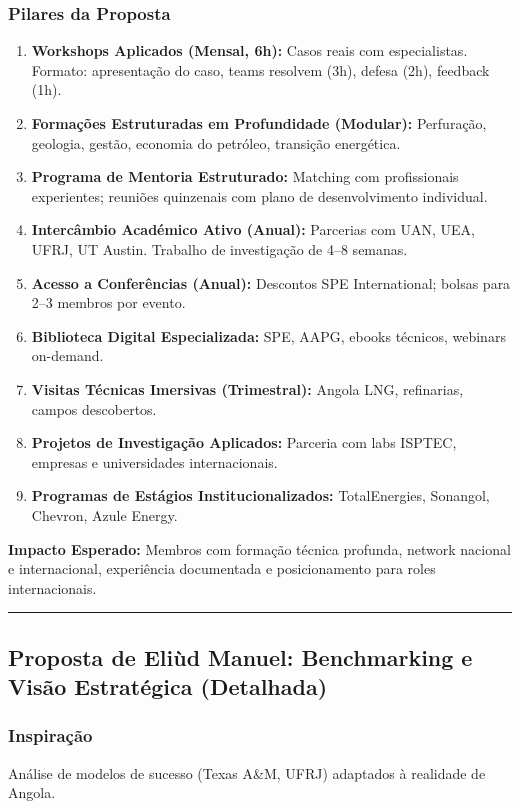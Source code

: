 \documentclass[12pt,a4paper]{article}
\newcommand{\proposalsep}{%
  \vspace{6pt}%
  {\color{gold}\rule{0.35\linewidth}{0.7pt}}%
  \vspace{4pt}%
}
\begin{document}
\subsubsection*{Pilares da Proposta}

\begin{enumerate}
    \item \textbf{Workshops Aplicados (Mensal, 6h):} Casos reais com especialistas. Formato: apresentação do caso, teams resolvem (3h), defesa (2h), feedback (1h).
    \item \textbf{Formações Estruturadas em Profundidade (Modular):} Perfuração, geologia, gestão, economia do petróleo, transição energética.
    \item \textbf{Programa de Mentoria Estruturado:} Matching com profissionais experientes; reuniões quinzenais com plano de desenvolvimento individual.
    \item \textbf{Intercâmbio Académico Ativo (Anual):} Parcerias com UAN, UEA, UFRJ, UT Austin. Trabalho de investigação de 4–8 semanas.
    \item \textbf{Acesso a Conferências (Anual):} Descontos SPE International; bolsas para 2–3 membros por evento.
    \item \textbf{Biblioteca Digital Especializada:} SPE, AAPG, ebooks técnicos, webinars on-demand.
    \item \textbf{Visitas Técnicas Imersivas (Trimestral):} Angola LNG, refinarias, campos descobertos.
    \item \textbf{Projetos de Investigação Aplicados:} Parceria com labs ISPTEC, empresas e universidades internacionais.
    \item \textbf{Programas de Estágios Institucionalizados:} TotalEnergies, Sonangol, Chevron, Azule Energy.
\end{enumerate}

\begin{infobox}
\small\textbf{Impacto Esperado:} Membros com formação técnica profunda, network nacional e internacional, experiência documentada e posicionamento para roles internacionais.
\end{infobox}

\proposalsep

\subsection{Proposta de Eliùd Manuel: Benchmarking e Visão Estratégica (Detalhada)}

\subsubsection*{Inspiração}
Análise de modelos de sucesso (Texas A\&M, UFRJ) adaptados à realidade de Angola.
\end{document}
